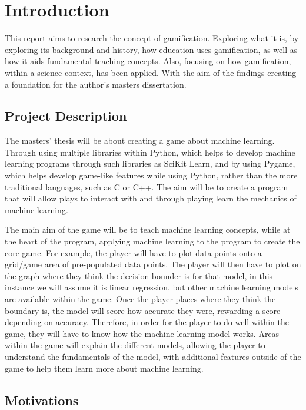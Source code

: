 \chapter{Introduction}
	\label{chap:intro}
	
	This report aims to research the concept of gamification. Exploring what it is, by exploring its background and history, how education uses gamification, as well as how it aids fundamental teaching concepts. Also, focusing on how gamification, within a science context, has been applied. With the aim of the findings creating a foundation for the author’s masters dissertation.
	
	
	\section{Project Description}
		\label{sec:intro_pro_desc} 	
		
		
		The masters' thesis will be about creating a game about machine learning. Through using multiple libraries within Python, which helps to develop machine learning programs through such libraries as SciKit Learn, and by using Pygame, which helps develop game-like features while using Python, rather than the more traditional languages, such as C or C++. The aim will be to create a program that will allow plays to interact with and through playing learn the mechanics of machine learning. 
		
		The main aim of the game will be to teach machine learning concepts, while at the heart of the program, applying machine learning to the program to create the core game. For example, the player will have to plot data points onto a grid/game area of pre-populated data points. The player will then have to plot on the graph where they think the decision bounder is for that model, in this instance we will assume it is linear regression, but other machine learning models are available within the game. Once the player places where they think the boundary is, the model will score how accurate they were, rewarding a score depending on accuracy. Therefore, in order for the player to do well within the game, they will have to know how the machine learning model works. Areas within the game will explain the different models, allowing the player to understand the fundamentals of the model, with additional features outside of the game to help them learn more about machine learning.
		
	\section{Motivations}
		\label{sec:intro_motivation} 
		
